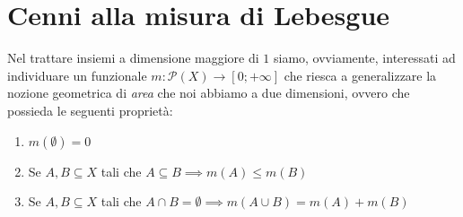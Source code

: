 \documentclass[main.tex]{subfiles}
\begin{document}
\chapter{Cenni alla misura di Lebesgue}

Nel trattare insiemi a dimensione maggiore di $1$ siamo, ovviamente, interessati ad individuare un funzionale $m: \mathcal{P}(X) \to [0; +\infty]$ che riesca a generalizzare la nozione geometrica di \emph{area} che noi abbiamo a due dimensioni, ovvero che possieda le seguenti proprietà:
\begin{enumerate}[label=\protect\circled{\arabic*}]
	\item $m(\emptyset) = 0$
	\item Se $A, B \subseteq X$ tali che $A \subseteq B \implies m(A) \leq m(B)$
	\item Se $A, B \subseteq X$ tali che $A \cap B = \emptyset \implies m(A \cup B) = m(A) + m(B)$
\end{enumerate}
\end{document}
